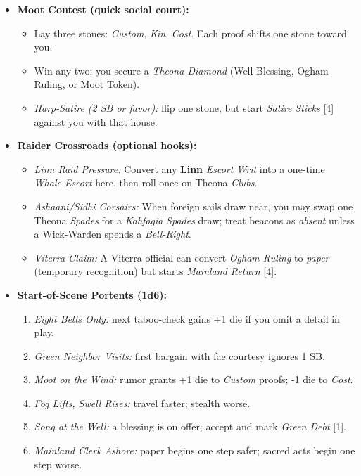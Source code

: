 \begin{itemize}
  \item \textbf{Moot Contest (quick social court):}
  \begin{itemize}
    \item Lay three stones: \emph{Custom}, \emph{Kin}, \emph{Cost}. Each proof shifts one stone toward you.
    \item Win any two: you secure a \emph{Theona Diamond} (Well-Blessing, Ogham Ruling, or Moot Token).  
    \item \emph{Harp-Satire (2 SB or favor):} flip one stone, but start \emph{Satire Sticks} [4] against you with that house.
  \end{itemize}

  \item \textbf{Raider Crossroads (optional hooks):}
  \begin{itemize}
    \item \emph{Linn Raid Pressure:} Convert any \textbf{Linn} \emph{Escort Writ} into a one-time \emph{Whale-Escort} here, then roll once on Theona \emph{Clubs}.
    \item \emph{Ashaani/Sidhi Corsairs:} When foreign sails draw near, you may swap one Theona \emph{Spades} for a \emph{Kahfagia} \emph{Spades} draw; treat beacons as \emph{absent} unless a Wick-Warden spends a \emph{Bell-Right}.
    \item \emph{Viterra Claim:} A Viterra official can convert \emph{Ogham Ruling} to \emph{paper} (temporary recognition) but starts \emph{Mainland Return} [4].
  \end{itemize}

  \item \textbf{Start-of-Scene Portents (1d6):}
  \begin{enumerate}
    \item \emph{Eight Bells Only:} next taboo-check gains +1 die if you omit a detail in play.
    \item \emph{Green Neighbor Visits:} first bargain with fae courtesy ignores 1 SB.
    \item \emph{Moot on the Wind:} rumor grants +1 die to \emph{Custom} proofs; -1 die to \emph{Cost}.
    \item \emph{Fog Lifts, Swell Rises:} travel faster; stealth worse.
    \item \emph{Song at the Well:} a blessing is on offer; accept and mark \emph{Green Debt} [1].
    \item \emph{Mainland Clerk Ashore:} paper begins one step safer; sacred acts begin one step worse.
  \end{enumerate}


\end{itemize}
